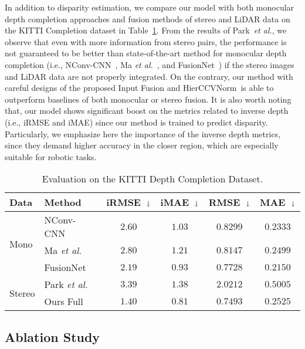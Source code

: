 \documentclass[letterpaper, 10 pt, conference]{ieeeconf}
\newcommand{\modelNameIncat}{Input Fusion }
\newcommand{\modelNameHierCBNPunc}{HierCCVNorm}
\newcommand{\tabref}{Table~\ref}
\newcommand{\etal}{\textit{et al.}}
\begin{document}
{{{In addition to disparity estimation, we compare our model with both monocular depth completion approaches and fusion methods of stereo and LiDAR data on the KITTI Completion dataset in \tabref{tab:kitti_completion}. From the results of Park~\etal, we observe that even with more information from stereo pairs, the performance is not guaranteed to be better than state-of-the-art method for monocular depth completion (i.e., NConv-CNN~\cite{depthnconv}, Ma \etal~\cite{depthsss2d}, and FusionNet~\cite{depthrgbguide}) if the stereo images and LiDAR data are not properly integrated. On the contrary, our method with careful designs of the proposed \modelNameIncat and \modelNameHierCBNPunc~is able to outperform baselines of both monocular or stereo fusion. It is also worth noting that, our model shows significant boost on the metrics related to inverse depth (i.e., iRMSE and iMAE) since our method is trained to predict disparity. Particularly, we emphasize here the importance of the inverse depth metrics, since they demand higher accuracy in the closer region, which are especially suitable for robotic tasks.



}
}

\begin{table}[!t]
\centering\scriptsize
\caption{\small{Evaluation on the KITTI Depth Completion Dataset.}}
\begin{tabular}{l l | c c c c}
\hline
Data & Method & iRMSE~$\shortdownarrow$ & iMAE~$\shortdownarrow$ & RMSE~$\shortdownarrow$ & MAE~$\shortdownarrow$ \\ \hline \hline
\multirow{3}{*}{Mono} & NConv-CNN~\cite{depthnconv} & $2.60$ & $1.03$ & $0.8299$ & $0.2333$ \\
 & Ma \textit{et al.}~\cite{depthsss2d} & $2.80$ & $1.21$ & $0.8147$ & $0.2499$ \\
 & FusionNet~\cite{depthrgbguide} & $2.19$ & $0.93$ & $0.7728$ & $\mathbf{0.2150}$ \\ \hline
\multirow{2}{*}{Stereo} & Park \textit{et al.}~\cite{LiDARstereoicra18} & $3.39$ & $1.38$ & $2.0212$ & $0.5005$ \\
& Ours Full & $\mathbf{1.40}$ & $\mathbf{0.81}$ & $\mathbf{0.7493}$ & $0.2525$ \\
\hline
\end{tabular}
\small
\label{tab:kitti_completion}
\end{table}

\subsection{Ablation Study}{

}}
\end{document}
